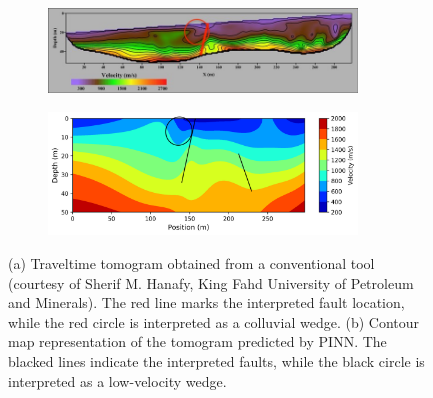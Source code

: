  \begin{figure}
       \centering
       \begin{subfigure}[]{1.\textwidth}
               \centering
               \includegraphics[width=0.9\textwidth]{figures/chap04_field_data/referance_tomo.png} 
               \caption{}
               \label{fig:referance_tomo}
       \end{subfigure}
       \begin{subfigure}[]{1.\textwidth}
               \centering
               \includegraphics[width=0.9\textwidth]{figures/chap04_field_data/contour_map.png}
               \caption{}
               \label{fig:contour_map}
       \end{subfigure}
       \caption{(a) Traveltime tomogram obtained from a conventional tool (courtesy of Sherif M. Hanafy, King Fahd University of Petroleum and Minerals). The red line marks the interpreted fault location, while the red circle is interpreted as a colluvial wedge.  (b) Contour map representation of the tomogram predicted by PINN. The blacked lines indicate the interpreted faults, while the black circle is interpreted as a low-velocity wedge. }
       \label{fig:comparison}
\end{figure}